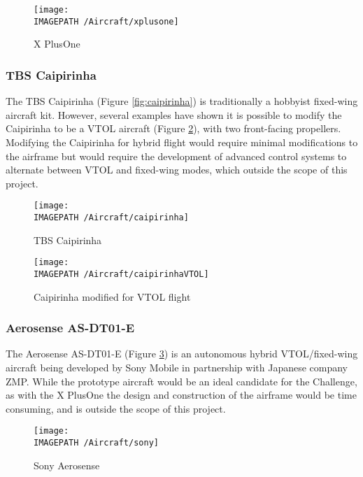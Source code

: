 \begin{figure}[!ht]
	\centering
	\texttt{[image: \\IMAGEPATH /Aircraft/xplusone]}
	\caption{X PlusOne}
	\label{fig:xplusone}
\end{figure}

\subsubsection*{TBS Caipirinha}
The TBS Caipirinha\cite{ref:caipirinha} (Figure \ref{fig:caipirinha}) is traditionally a hobbyist fixed-wing aircraft kit. However, several examples have shown it is possible to modify the Caipirinha to be a VTOL aircraft\cite{ref:caipirinhaVTOL} (Figure \ref{fig:caipirinhaVTOL}), with two front-facing propellers. Modifying the Caipirinha for hybrid flight would require minimal modifications to the airframe but would require the development of advanced control systems to alternate between VTOL and fixed-wing modes, which outside the scope of this project.

\begin{figure}[!ht]
	\centering
	\begin{minipage}{.5\textwidth}
		\centering
		\texttt{[image: \\IMAGEPATH /Aircraft/caipirinha]}
		\caption{TBS Caipirinha}
		\label{fig:caipirinha}
	\end{minipage}%
	\begin{minipage}{.5\textwidth}
		\centering
		\texttt{[image: \\IMAGEPATH /Aircraft/caipirinhaVTOL]}
		\caption{Caipirinha modified for VTOL flight}
		\label{fig:caipirinhaVTOL}
	\end{minipage}
\end{figure}

\subsubsection*{Aerosense AS-DT01-E}
The Aerosense AS-DT01-E\cite{ref:sony} (Figure \ref{fig:sony}) is an autonomous hybrid VTOL/fixed-wing aircraft being developed by Sony Mobile in partnership with Japanese company ZMP. While the prototype aircraft would be an ideal candidate for the Challenge, as with the X PlusOne the design and construction of the airframe would be time consuming, and is outside the scope of this project.

\begin{figure}[!ht]
	\centering
	\texttt{[image: \\IMAGEPATH /Aircraft/sony]}
	\caption{Sony Aerosense}
	\label{fig:sony}
\end{figure}

